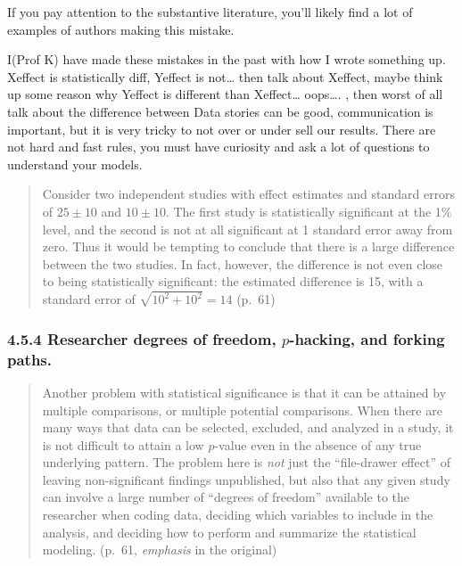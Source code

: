 \documentclass[
]{article}
\begin{document}
If you pay attention to the substantive literature, you'll likely find a
lot of examples of authors making this mistake.

I(Prof K) have made these mistakes in the past with how I wrote
something up. Xeffect is statistically diff, Yeffect is not\ldots{} then
talk about Xeffect, maybe think up some reason why Yeffect is different
than Xeffect\ldots{} oops\ldots. , then worst of all talk about the
difference between Data stories can be good, communication is important,
but it is very tricky to not over or under sell our results. There are
not hard and fast rules, you must have curiosity and ask a lot of
questions to understand your models.

\begin{quote}
Consider two independent studies with effect estimates and standard
errors of \(25 \pm 10\) and \(10 \pm 10\). The first study is
statistically significant at the 1\% level, and the second is not at all
significant at 1 standard error away from zero. Thus it would be
tempting to conclude that there is a large difference between the two
studies. In fact, however, the difference is not even close to being
statistically significant: the estimated difference is 15, with a
standard error of \(\sqrt{10^2 + 10^2} = 14\) (p.~61)
\end{quote}

\hypertarget{researcher-degrees-of-freedom-p-hacking-and-forking-paths.}{%
\subsubsection{\texorpdfstring{4.5.4 Researcher degrees of freedom,
\(p\)-hacking, and forking
paths.}{4.5.4 Researcher degrees of freedom, p-hacking, and forking paths.}}\label{researcher-degrees-of-freedom-p-hacking-and-forking-paths.}}

\begin{quote}
Another problem with statistical significance is that it can be attained
by multiple comparisons, or multiple potential comparisons. When there
are many ways that data can be selected, excluded, and analyzed in a
study, it is not difficult to attain a low \(p\)-value even in the
absence of any true underlying pattern. The problem here is \emph{not}
just the ``file-drawer effect'' of leaving non-significant findings
unpublished, but also that any given study can involve a large number of
``degrees of freedom'' available to the researcher when coding data,
deciding which variables to include in the analysis, and deciding how to
perform and summarize the statistical modeling. (p.~61, \emph{emphasis}
in the original)
\end{quote}
\end{document}
